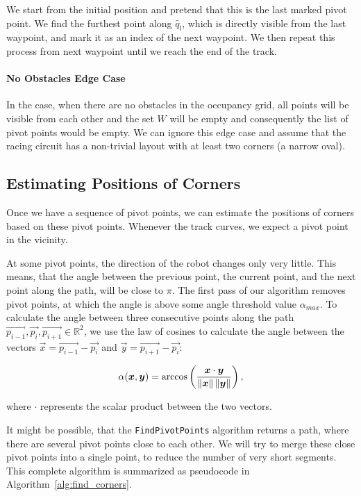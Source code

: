 We start from the initial position and pretend that this is the last marked pivot point. We find the furthest point along $\hat{q}_l$, which is directly visible from the last waypoint, and mark it as an index of the next waypoint. We then repeat this process from next waypoint until we reach the end of the track.

\paragraph{No Obstacles Edge Case} In the case, when there are no obstacles in the occupancy grid, all points will be visible from each other and the set $W$ will be empty and consequently the list of pivot points would be empty. We can ignore this edge case and assume that the racing circuit has a non-trivial layout with at least two corners (a narrow oval).

\subsection{Estimating Positions of Corners}

Once we have a sequence of pivot points, we can estimate the positions of corners based on these pivot points. Whenever the track curves, we expect a pivot point in the vicinity.

At some pivot points, the direction of the robot changes only very little. This means, that the angle between the previous point, the current point, and the next point along the path, will be close to $\pi$. The first pass of our algorithm removes pivot points, at which the angle is above some angle threshold value $\alpha_{max}$. To calculate the angle between three consecutive points along the path $\vec{p_{i-1}}, \vec{p_i}, \vec{p_{i+1}}\in\mathbb{R}^2$, we use the law of cosines to calculate the angle between the vectors $\vec{x}=\vec{p_{i-1}}-\vec{p_i}$ and $\vec{y}=\vec{p_{i+1}}-\vec{p_i}$:

\[
	\alpha(\bm{x}, \bm{y})=\arccos \left(\dfrac{\bm{x}\cdot\bm{y}}{\left\lVert\bm{x}\right\rVert\left\lVert\bm{y}\right\rVert}\right),
\]

where $\cdot$ represents the scalar product between the two vectors.

It might be possible, that the \texttt{FindPivotPoints} algorithm returns a path, where there are several pivot points close to each other. We will try to merge these close pivot points into a single point, to reduce the number of very short segments. This complete algorithm is summarized as pseudocode in Algorithm~\ref{alg:find_corners}.

